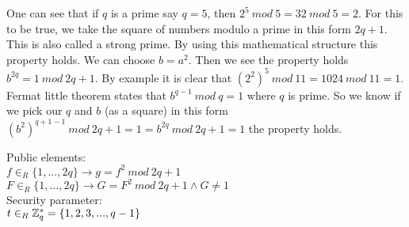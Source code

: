 One can see that if \begin{math}q\end{math} is a prime say \begin{math}q=5\end{math}, then \begin{math}2^5 \ mod \ 5 = 32 \ mod \ 5 = 2\end{math}. For this to be true, we take the square of numbers modulo a prime in this form \begin{math}2q+1\end{math}. This is also called a strong prime. By using this mathematical structure this property holds. We can choose \begin{math}b=a^2\end{math}. Then we see the property holds \begin{math}b^{2q} = 1 \ mod \ 2q+1\end{math}. By example it is clear that \begin{math}(2^2)^5 \ mod \ 11 = 1024 \ mod \ 11 = 1\end{math}. Fermat little theorem states that \begin{math}b^{q-1} \ mod \ q = 1\end{math} where \begin{math}q\end{math} is prime. So we know if we pick our \begin{math}q\end{math} and \begin{math}b\end{math} (as a square)  in this form \begin{math}(b^{2})^{q+1-1} \ mod \ 2q+1 =1 =  b^{2q} \ mod \ 2q+1 =1\end{math} the property holds.

\noindent
\begin{infobox}
Public elements:\\
\begin{math}f \in_R \{1,...,2q\} \rightarrow g= f^2 \ mod\ 2q+1\end{math}\\
\begin{math}F \in_R \{1,...,2q\}\rightarrow G= F^2 \ mod\ 2q+1 \wedge G\neq1\end{math}\\
Security parameter:\\
\begin{math} t \in_R \mathbb{Z}_q^* = \{1,2,3,...,q-1\} \end{math}
\end{infobox}


